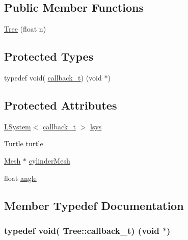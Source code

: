 \subsection*{Public Member Functions}
\begin{DoxyCompactItemize}
\item 
\hyperlink{class_tree_ab4ca65433a2e70d6fb468704a8f5d827}{Tree} (float n)
\end{DoxyCompactItemize}
\subsection*{Protected Types}
\begin{DoxyCompactItemize}
\item 
typedef void( \hyperlink{class_tree_a9978ae9b2adc867a50b92a110c6c44ef}{callback\+\_\+t}) (void $\ast$)
\end{DoxyCompactItemize}
\subsection*{Protected Attributes}
\begin{DoxyCompactItemize}
\item 
\hyperlink{class_l_system}{L\+System}$<$ \hyperlink{class_tree_a9978ae9b2adc867a50b92a110c6c44ef}{callback\+\_\+t} $>$ \hyperlink{class_tree_af10a84eb2afe93ab71dc1d7e12eb93fe}{lsys}
\item 
\hyperlink{class_turtle}{Turtle} \hyperlink{class_tree_a3eb5b35677be3847ed46da046564cf4c}{turtle}
\item 
\hyperlink{class_mesh}{Mesh} $\ast$ \hyperlink{class_tree_a27afed9bc6d61d5e7a83df806c42ba6b}{cylinder\+Mesh}
\item 
float \hyperlink{class_tree_a3dae13ef4932f05efe44e3c4bc002ad6}{angle}
\end{DoxyCompactItemize}


\subsection{Member Typedef Documentation}
\subsubsection[{\texorpdfstring{callback\+\_\+t}{callback_t}}]{\setlength{\rightskip}{0pt plus 5cm}typedef void( Tree\+::callback\+\_\+t) (void $\ast$)\hspace{0.3cm}{\ttfamily [protected]}}\hypertarget{class_tree_a9978ae9b2adc867a50b92a110c6c44ef}{}\label{class_tree_a9978ae9b2adc867a50b92a110c6c44ef}


